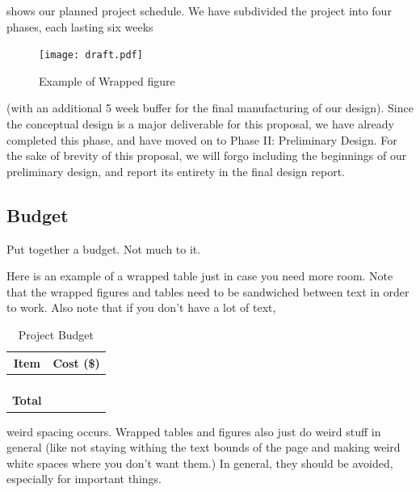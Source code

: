 \documentclass[proposal]{byu-aero}
\begin{document}


 shows our planned project schedule. We have subdivided the project into four phases, each lasting six weeks %
\begin{figure}
	\texttt{[image: draft.pdf]}
	\caption{Example of Wrapped figure}
	\label{fig:wrappedfig}
\end{figure} (with an additional 5 week buffer for the final manufacturing of our design). Since the conceptual design is a major deliverable for this proposal, we have already completed this phase, and have moved on to Phase II: Preliminary Design. For the sake of brevity of this proposal, we will forgo including the beginnings of our preliminary design, and report its entirety in the final design report.



\subsection{Budget}
\label{ssec:budget}

Put together a budget. Not much to it.

Here is an example of a wrapped table just in case you need more room. Note that the wrapped figures and tables need to be sandwiched between text in order to work.  Also note that if you don't have a lot of text, 
\begin{table}
	\centering
	\renewcommand*{\arraystretch}{1.2}
	\caption{Project Budget}
	\label{tab:budget}
	\begin{tabular}{ |c|c| } 
		\hline
		\rowcolor{BYUbluemid}
		Item & Cost (\$) \\ 
		\hline
		&  \\ 
		&  \\ 
		&  \\ 
		&  \\ 
		\hline
		\textbf{Total} & \textbf{} \\ 
		\hline
		
	\end{tabular}
\end{table}
weird spacing occurs. Wrapped tables and figures also just do weird stuff in general (like not staying withing the text bounds of the page and making weird white spaces where you don't want them.) In general, they should be avoided, especially for important things.
\end{document}
